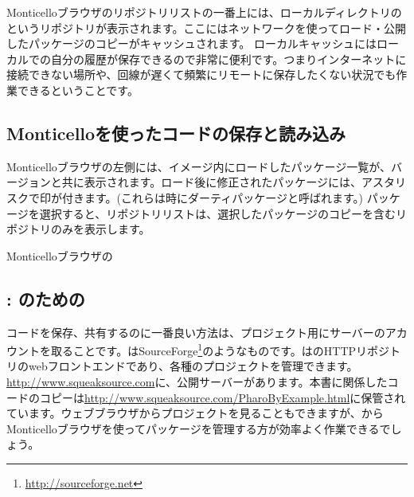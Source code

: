 \documentclass[a4paper,10pt,twoside]{book}
\begin{document}
Monticelloブラウザのリポジトリリストの一番上には、ローカルディレクトリの というリポジトリが表示されます。ここにはネットワークを使ってロード・公開したパッケージのコピーがキャッシュされます。
ローカルキャッシュにはローカルでの自分の履歴が保存できるので非常に便利です。つまりインターネットに接続できない場所や、回線が遅くて頻繁にリモートに保存したくない状況でも作業できるということです。

\subsection{Monticelloを使ったコードの保存と読み込み}
Monticelloブラウザの左側には、イメージ内にロードしたパッケージ一覧が、バージョンと共に表示されます。ロード後に修正されたパッケージには、アスタリスクで印が付きます。(これらは時にダーティパッケージと呼ばれます。) パッケージを選択すると、リポジトリリストは、選択したパッケージのコピーを含むリポジトリのみを表示します。


Monticelloブラウザの

\subsection{\ind{\sqsrc}: \pharo のための}

コードを保存、共有するのに一番良い方法は、プロジェクト用に\sqsrc サーバーのアカウントを取ることです。\sqsrc はSourceForge\footnote{\url{http://sourceforge.net}}のようなものです。\sqsrc はのHTTPリポジトリのwebフロントエンドであり、各種のプロジェクトを管理できます。
\url{http://www.squeaksource.com}に、公開\sqsrc サーバーがあります。本書に関係したコードのコピーは\url{http://www.squeaksource.com/PharoByExample.html}に保管されています。ウェブブラウザからプロジェクトを見ることもできますが、\pharo からMonticelloブラウザを使ってパッケージを管理する方が効率よく作業できるでしょう。

\end{document}
